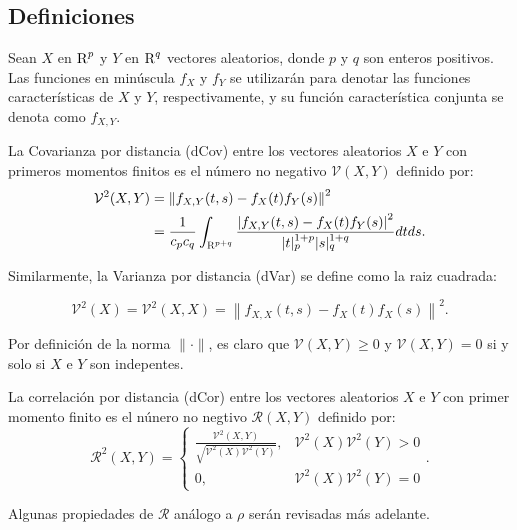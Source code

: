 \subsection{Definiciones}

Sean $X$ en $\textsc{R}^p$ y $Y$ en $\textsc{R}^q$ vectores aleatorios, donde $p$ y $q$ son enteros positivos. Las funciones en min\'uscula $f_X$ y $f_Y$ se utilizarán para denotar las funciones caracter\'isticas de $X$ y $Y$, respectivamente, y su funci\'on caracter\'istica conjunta se denota como $f_{X, Y}$. 

\begin{defn}
	La Covarianza por distancia (dCov) entre los vectores aleatorios $X$ e $Y$ con primeros momentos finitos es el n\'umero no negativo $\mathcal{V}(X, Y)$ definido por:
	\begin{equation}
		\begin{aligned}\label{dcov_formula}
			\mathcal{V}^2(X, Y) & =\left\|f_{X, Y}(t, s)-f_X(t) f_Y(s)\right\|^2 \\
			& =\frac{1}{c_p c_q} \int_{\textsc{R}^{p+q}} \frac{\left|f_{X, Y}(t, s)-f_X(t) f_Y(s)\right|^2}{|t|_p^{1+p}|s|_q^{1+q}} d t d s .
			\end{aligned}
	\end{equation}

	\end{defn}

	Similarmente, la Varianza por distancia (dVar) se define como la raiz cuadrada:

	$$
	\mathcal{V}^2(X)=\mathcal{V}^2(X, X)=\left\|f_{X, X}(t, s)-f_X(t) f_X(s)\right\|^2 .
	$$

	Por definici\'on de la norma $\|\cdot\|$, es claro que  $\mathcal{V}(X, Y) \geq 0$ y $\mathcal{V}(X, Y)=0$ si y solo si $X$ e $Y$ son indepentes.

	\begin{defn} 
		La correlaci\'on por distancia (dCor) entre los vectores aleatorios $X$ e $Y$ con primer momento finito es el n\'unero no negtivo $\mathcal{R}(X, Y)$ definido por:
		$$
		\mathcal{R}^2(X, Y)= \begin{cases}\frac{\mathcal{V}^2(X, Y)}{\sqrt{\mathcal{V}^2(X) \mathcal{V}^2(Y)}}, & \mathcal{V}^2(X) \mathcal{V}^2(Y)>0 \\ 0, & \mathcal{V}^2(X) \mathcal{V}^2(Y)=0\end{cases}.
		$$

	Algunas propiedades de $\mathcal{R}$ an\'alogo a $\rho$ ser\'an revisadas m\'as adelante. 
	\end{defn}

